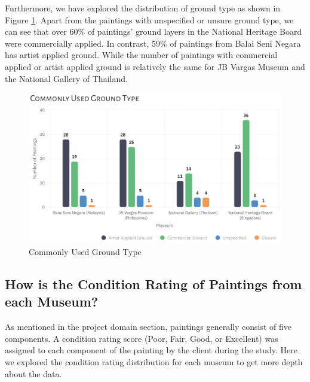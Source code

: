 \documentclass[11pt, oneside]{article}
\begin{document}
\noindent Furthermore, we have explored the distribution of ground type as shown in Figure \ref{ground_type}. Apart from the paintings with unspecified or unsure ground type, we can see that over 60\% of paintings' ground layers in the National Heritage Board were commercially applied. In contrast, 59\% of paintings from Balai Seni Negara has artist applied ground. While the number of paintings with commercial applied or artist applied ground is relatively the same for JB Vargas Museum and the National Gallery of Thailand.

\begin{figure}[H]
    \centering
    \includegraphics[scale=0.5]{images/ground_type.png}
    \caption{Commonly Used Ground Type}
    \label{ground_type}
\end{figure}

\subsection{How is the Condition Rating of Paintings from each Museum?}
As mentioned in the project domain section, paintings generally consist of five components. A condition rating score (Poor, Fair, Good, or Excellent) was assigned to each component of the painting by the client during the study. Here we explored the condition rating distribution for each museum to get more depth about the data.
\end{document}
